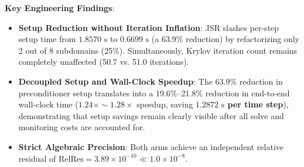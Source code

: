 \documentclass[preprint,12pt,3p]{elsarticle}
\begin{document}
\begin{table}[htbp]
\centering
\small
\caption{Historical benchmark: Detailed execution breakdown of the Flagship $48^3$ Benchmark ($110,592$ DOFs, 8 subdomains, 3 steps).}
\label{tab:flagship48}
\end{table}

\textbf{Key Engineering Findings}:
\begin{itemize}
    \item \textbf{Setup Reduction without Iteration Inflation}: JSR slashes per-step setup time from $1.8570\text{ s}$ to $0.6699\text{ s}$ (a 63.9\% reduction) by refactorizing only 2 out of 8 subdomains (25\%). Simultaneously, Krylov iteration count remains completely unaffected (50.7 vs. 51.0 iterations).
    \item \textbf{Decoupled Setup and Wall-Clock Speedup}: The 63.9\% reduction in preconditioner setup translates into a 19.6\%--21.8\% reduction in end-to-end wall-clock time ($1.24\times \sim 1.28\times$ speedup, saving \textbf{$1.2872\text{ s}$ per time step}), demonstrating that setup savings remain clearly visible after all solve and monitoring costs are accounted for.
    \item \textbf{Strict Algebraic Precision}: Both arms achieve an independent relative residual of $\text{RelRes} = 3.89 \times 10^{-10} \ll 1.0 \times 10^{-8}$.
\end{itemize}
\end{document}
